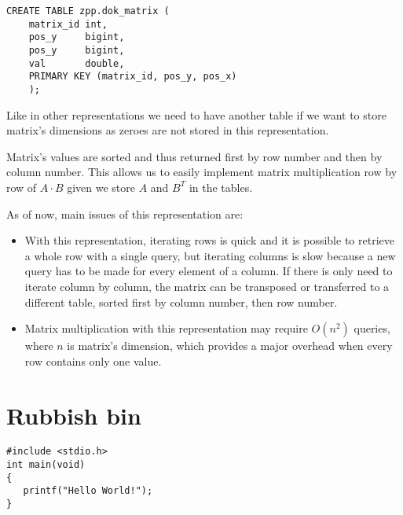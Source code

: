 \documentclass{article}
\begin{document}
\begin{lstlisting}[style=SQLStyle]
    CREATE TABLE zpp.dok_matrix (
    matrix_id int,
    pos_y     bigint,
    pos_y     bigint,
    val       double,
    PRIMARY KEY (matrix_id, pos_y, pos_x)
    );
\end{lstlisting}

Like in other representations we need to have another table if we want to store matrix's dimensions as zeroes are not stored in this representation.

Matrix's values are sorted and thus returned first by row number and then by column number. This allows us to easily implement matrix multiplication row by row of $A \cdot B$ given we store $A$ and $B^T$ in the tables.

As of now, main issues of this representation are:
\begin{itemize}
    \item With this representation, iterating rows is quick and it is possible to retrieve a whole row with a single query, but iterating columns is slow because a new query has to be made for every element of a column.
    If there is only need to iterate column by column, the matrix can be transposed or transferred to a different table, sorted first by column number, then row number.
    \item Matrix multiplication with this representation may require $O(n^2)$ queries, where $n$ is matrix's dimension, which provides a major overhead when every row contains only one value.
\end{itemize}

\pagebreak
\section*{Rubbish bin}

\begin{lstlisting}[style=CStyle]
#include <stdio.h>
int main(void)
{
   printf("Hello World!"); 
}
\end{lstlisting}
\end{document}

